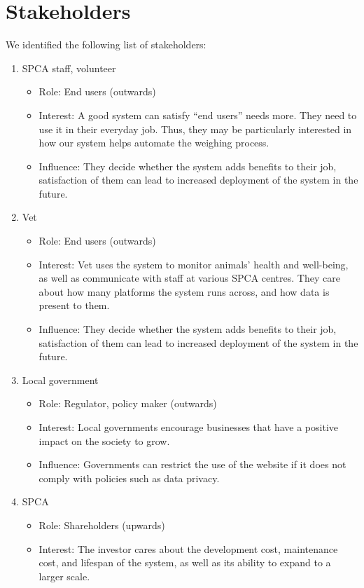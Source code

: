 \section{Stakeholders}
We identified the following list of stakeholders:
\begin{enumerate}
    \item SPCA staff, volunteer
    \begin{itemize}
        \item Role: End users (outwards)
        \item Interest: A  good system can satisfy “end users” needs more. They need to use it in their everyday job. Thus, they may be particularly interested in how  our system helps automate the weighing process.
        \item Influence: They decide whether the system adds benefits to their job, satisfaction of them can lead to increased deployment of the system in the future.
    \end{itemize}
    \item Vet
    \begin{itemize}
        \item Role: End users (outwards)
        \item Interest: Vet uses the system to monitor animals’ health and well-being, as well as communicate with staff at various SPCA centres. They care about how many platforms the system runs across, and how data is present to them.
        \item Influence: They decide whether the system adds benefits to their job, satisfaction of them can lead to increased deployment of the system in the future.
    \end{itemize}
    \item Local government
    \begin{itemize}
        \item Role: Regulator, policy maker (outwards)
        \item Interest: Local governments encourage businesses that have a positive impact on the society to grow.
        \item Influence: Governments can restrict the use of the website if it does not comply with policies such as data privacy.
    \end{itemize}
    \item SPCA
    \begin{itemize}
        \item Role: Shareholders (upwards)
        \item Interest: The investor cares about the development cost, maintenance cost, and lifespan of the system, as well as its ability to expand to a larger scale.

\end{itemize}
\end{enumerate}
